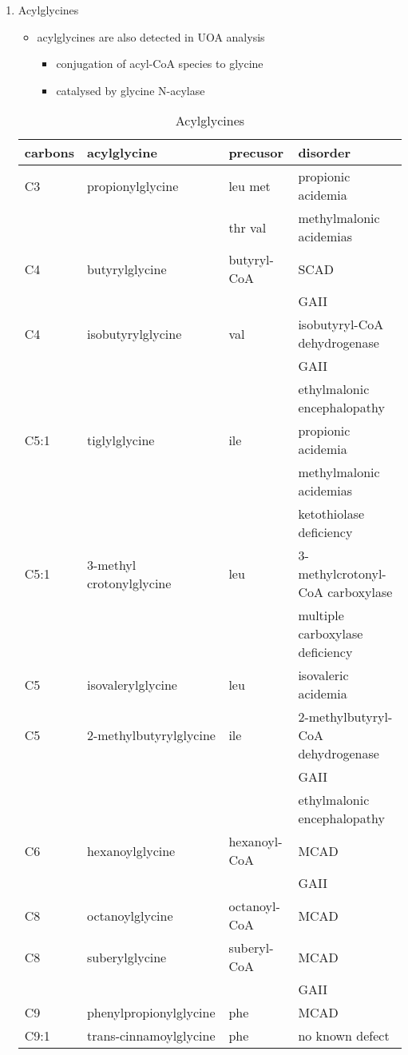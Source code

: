 \documentclass[12pt]{scrartcl}
\begin{document}
\begin{enumerate}
\item Acylglycines
\label{sec:org26a3ffb}
\begin{itemize}
\item acylglycines are also detected in UOA analysis
\begin{itemize}
\item conjugation of acyl-CoA species to glycine
\item catalysed by glycine N-acylase
\end{itemize}
\end{itemize}

\begin{table}[htbp]
\caption{\label{tab:orgcb83a92}Acylglycines}
\centering
\begin{tabular}{llll}
carbons & acylglycine & precusor & disorder\\
\hline
C3 & propionylglycine & leu met & propionic acidemia\\
 &  & thr val & methylmalonic acidemias\\
C4 & butyrylglycine & butyryl-CoA & SCAD\\
 &  &  & GAII\\
C4 & isobutyrylglycine & val & isobutyryl-CoA dehydrogenase\\
 &  &  & GAII\\
 &  &  & ethylmalonic encephalopathy\\
C5:1 & tiglylglycine & ile & propionic acidemia\\
 &  &  & methylmalonic acidemias\\
 &  &  & ketothiolase deficiency\\
C5:1 & 3-methyl crotonylglycine & leu & 3-methylcrotonyl-CoA carboxylase\\
 &  &  & multiple carboxylase deficiency\\
C5 & isovalerylglycine & leu & isovaleric acidemia\\
C5 & 2-methylbutyrylglycine & ile & 2-methylbutyryl-CoA dehydrogenase\\
 &  &  & GAII\\
 &  &  & ethylmalonic encephalopathy\\
C6 & hexanoylglycine & hexanoyl-CoA & MCAD\\
 &  &  & GAII\\
C8 & octanoylglycine & octanoyl-CoA & MCAD\\
C8 & suberylglycine & suberyl-CoA & MCAD\\
 &  &  & GAII\\
C9 & phenylpropionylglycine & phe & MCAD\\
C9:1 & trans-cinnamoylglycine & phe & no known defect\\
\end{tabular}
\end{table}
\end{enumerate}
\end{document}
